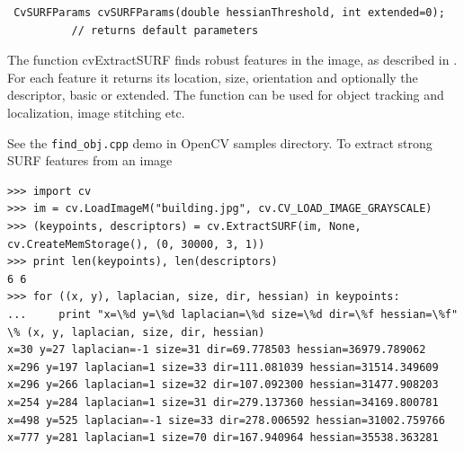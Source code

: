 \begin{description}
\begin{lstlisting}
 CvSURFParams cvSURFParams(double hessianThreshold, int extended=0); 
          // returns default parameters
\end{lstlisting}
\else
{}
\fi
\end{description}

The function cvExtractSURF finds robust features in the image, as
described in \cite{Bay06}. For each feature it returns its location, size,
orientation and optionally the descriptor, basic or extended. The function
can be used for object tracking and localization, image stitching etc.

\ifC
See the
\texttt{find\_obj.cpp} demo in OpenCV samples directory.
\else
To extract strong SURF features from an image

\begin{lstlisting}
>>> import cv
>>> im = cv.LoadImageM("building.jpg", cv.CV_LOAD_IMAGE_GRAYSCALE)
>>> (keypoints, descriptors) = cv.ExtractSURF(im, None, cv.CreateMemStorage(), (0, 30000, 3, 1))
>>> print len(keypoints), len(descriptors)
6 6
>>> for ((x, y), laplacian, size, dir, hessian) in keypoints:
...     print "x=\%d y=\%d laplacian=\%d size=\%d dir=\%f hessian=\%f" \% (x, y, laplacian, size, dir, hessian)
x=30 y=27 laplacian=-1 size=31 dir=69.778503 hessian=36979.789062
x=296 y=197 laplacian=1 size=33 dir=111.081039 hessian=31514.349609
x=296 y=266 laplacian=1 size=32 dir=107.092300 hessian=31477.908203
x=254 y=284 laplacian=1 size=31 dir=279.137360 hessian=34169.800781
x=498 y=525 laplacian=-1 size=33 dir=278.006592 hessian=31002.759766
x=777 y=281 laplacian=1 size=70 dir=167.940964 hessian=35538.363281
\end{lstlisting}

\fi

